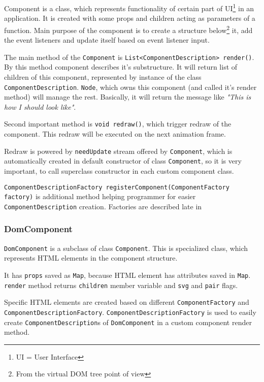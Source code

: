      Component is a class, which represents functionality of certain part of UI\footnote{UI = User Interface} in an application.
      It is created with some props and children acting as parameters of a function. 
      Main purpose of the component is to create a structure below\footnote{From the virtual DOM tree point of view} it, 
      add the event listeners and update itself based on event listener input.

      The main method of the \texttt{Component} is \texttt{List<ComponentDescription> render()}. 
      By this method component describes it's substructure.
      It will return list of children of this component, represented by instance of the class \texttt{ComponentDescription}. 
      \texttt{Node}, which owns this component (and called it's render method) will manage the rest.
      Basically, it will return the message like \textit{"This is how I should look like"}.

      Second important method is \texttt{void redraw()}, which trigger redraw of the component. 
      This redraw will be executed on the next animation frame. 

      Redraw is powered by \texttt{needUpdate} stream offered by \texttt{Component}, 
      which is automatically created in default constructor of class \texttt{Component}, 
      so it is very important, to call superclass constructor in each custom component class.

      \texttt{ComponentDescriptionFactory registerComponent(ComponentFactory factory)} is additional method helping programmer 
      for easier \texttt{ComponentDescription} creation. 
      Factories are described late in 
      
    \subsubsection{DomComponent}\label{subsubsec:our-architecture-core-dom-component}
      \texttt{DomComponent} is a subclass of class \texttt{Component}. 
      This is specialized class, which represents HTML elements in the component structure.

      It has \texttt{props} saved as \texttt{Map}, because HTML element has attributes saved in \texttt{Map}.
      \texttt{render} method returns \texttt{children} member variable and \texttt{svg} and \texttt{pair} flags.

      Specific HTML elements are created based on different \texttt{ComponentFactory} and \texttt{ComponentDescriptionFactory}.
      \texttt{ComponentDescriptionFactory} is used to easily create \texttt{ComponentDescription}s of \texttt{DomComponent} in a custom component render method. 

